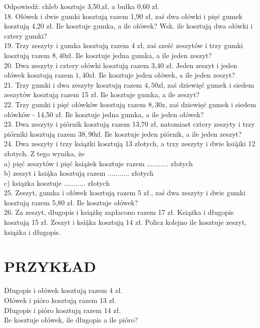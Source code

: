 \documentclass[10pt]{article}
\begin{document}
Odpowiedź: chleb kosztuje 3,50,zł, a bułka 0,60 zł.\\
18. Ołówek i dwie gumki kosztują razem 1,90 zł, zaś dwa ołówki i pięć gumek kosztują 4,20 zł. Ile kosztuje gumka, a ile ołówek? Wsk. ile kosztują dwa ołówki i cztery gumki?\\
19. Trzy zeszyty i gumka kosztują razem 4 zł, zaś sześć zeszytów i trzy gumki kosztują razem \(8,40 \mathrm{zł}\). Ile kosztuje jedna gumka, a ile jeden zeszyt?\\
20. Dwa zeszyty i cztery ołówki kosztują razem 3,40 zł. Jeden zeszyt i jeden ołówek kosztują razem \(1,40 \mathrm{zł}\). Ile kosztuje jeden ołówek, a ile jeden zeszyt?\\
21. Trzy gumki i dwa zeszyty kosztują razem \(4,50 \mathrm{zl}\), zaś dziewięć gumek i siedem zeszytów kosztują razem 15 zł. Ile kosztuje gumka, a ile zeszyt?\\
22. Trzy gumki i pięć ołówków kosztują razem \(8,30 \mathrm{z}\), zaś dziewięć gumek i siedem ołówków - 14,50 zł. Ile kosztuje jedna gumka, a ile jeden ołówek?\\
23. Dwa zeszyty i piórnik kosztują razem 13,70 zł, natomiast cztery zeszyty i trzy piórniki kosztują razem \(38,90 \mathrm{zl}\). Ile kosztuje jeden piórnik, a ile jeden zeszyt?\\
24. Dwa zeszyty i trzy książki kosztują 13 złotych, a trzy zeszyty i dwie ksią̇̇iki 12 złotych. Z tego wynika, że\\
a) pięć zeszytów i pięć książek kosztuje razem ........... złotych\\
b) zeszyt i ksią̇̇ka kosztują razem ........... złotych\\
c) książka kosztuje ........... złotych\\
25. Zeszyt, gumka i ołówek kosztują razem 5 zł., zaś dwa zeszyty i dwie gumki kosztują razem 5,80 zł. Ile kosztuje ołówek?\\
26. Za zeszyt, długopis i książkę zapłacono razem 17 zł. Książka i długopis kosztują 15 zł. Zeszyt i ksią̇̇ka kosztują 14 zł. Policz kolejno ile kosztuje zeszyt, książka i długopis.

\section*{PRZYKŁAD}
Długopis i ołówek kosztują razem 4 zł.\\
Ołówek i pióro kosztują razem 13 zł.\\
Długopis i pióro kosztują razem 14 zł.\\
Ile kosztuje ołówek, ile długopis a ile pióro?
\end{document}
